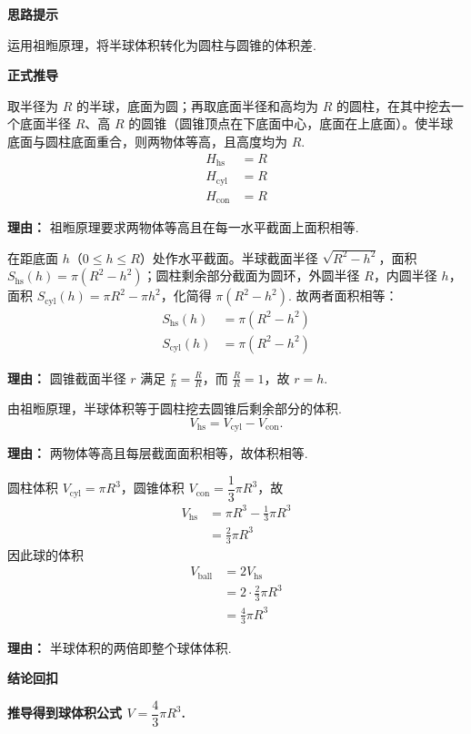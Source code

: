 \begin{proofbox}
	\textbf{\textcolor{CProof}{思路提示}}

	运用祖暅原理，将半球体积转化为圆柱与圆锥的体积差.

	\medskip
	\textbf{\textcolor{CProof}{正式推导}}
	\begin{description}[style=nextline, leftmargin=2.8em, labelsep=0.5em, itemsep=0.55em]
		\item[\textbf{步骤一（构造组合体）：}] 取半径为 $R$ 的半球，底面为圆；再取底面半径和高均为 $R$ 的圆柱，在其中挖去一个底面半径 $R$、高 $R$ 的圆锥（圆锥顶点在下底面中心，底面在上底面）。使半球底面与圆柱底面重合，则两物体等高，且高度均为 $R$.
			\[
				\begin{aligned}
					H_{\text{hs}} &= R \\
					H_{\text{cyl}} &= R \\
					H_{\text{con}} &= R
			\end{aligned}
			\]
			\par\textbf{理由：}
			祖暅原理要求两物体等高且在每一水平截面上面积相等.

		\item[\textbf{步骤二（截面面积相等）：}] 在距底面 $h$（$0\le h\le R$）处作水平截面。半球截面半径 $\sqrt{R^2-h^2}$，面积 $S_{\text{hs}}(h)=\pi(R^2-h^2)$；圆柱剩余部分截面为圆环，外圆半径 $R$，内圆半径 $h$，面积 $S_{\text{cyl}}(h)=\pi R^2-\pi h^2$，化简得 $\pi(R^2-h^2)$. 故两者面积相等：
			\[
				\begin{aligned}
					S_{\text{hs}}(h) &= \pi(R^2-h^2) \\
					S_{\text{cyl}}(h) &= \pi(R^2-h^2)
			\end{aligned}
			\]
			\par\textbf{理由：}
			圆锥截面半径 $r$ 满足 $\frac{r}{h} = \frac{R}{R}$，而 $\frac{R}{R}=1$，故 $r=h$.

		\item[\textbf{步骤三（应用祖暅原理）：}] 由祖暅原理，半球体积等于圆柱挖去圆锥后剩余部分的体积.
			\[
				V_{\text{hs}} = V_{\text{cyl}} - V_{\text{con}}.
			\]
			\par\textbf{理由：}
			两物体等高且每层截面面积相等，故体积相等.

		\item[\textbf{步骤四（计算得球体积）：}] 圆柱体积 $V_{\text{cyl}}=\pi R^3$，圆锥体积 $V_{\text{con}}=\dfrac{1}{3}\pi R^3$，故
			\[
				\begin{aligned}
					V_{\text{hs}} &= \pi R^3 - \frac{1}{3}\pi R^3 \\
					&= \frac{2}{3}\pi R^3
			\end{aligned}
			\]
			因此球的体积
			\[
				\begin{aligned}
					V_{\text{ball}} &= 2V_{\text{hs}} \\
					&= 2 \cdot \frac{2}{3}\pi R^3 \\
					&= \frac{4}{3}\pi R^3
			\end{aligned}
			\]
			\par\textbf{理由：}
			半球体积的两倍即整个球体体积.
	\end{description}

	\medskip
	\textbf{\textcolor{CProof}{结论回扣}}

	\textbf{推导得到球体积公式 $V=\dfrac{4}{3}\pi R^3$.}
\end{proofbox}
